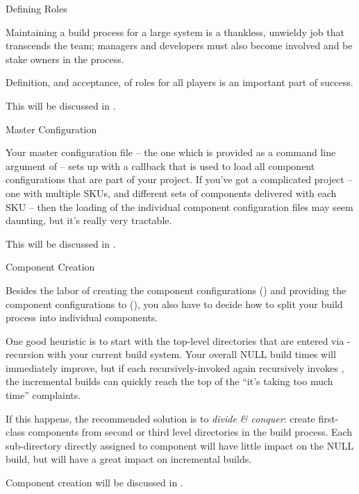 \begin{description}
\item Defining Roles

  Maintaining a build process for a large system is a thankless,
  unwieldy job that transcends the \bni team; managers and developers
  must also become involved and be stake owners in the process.

  Definition, and acceptance, of roles for all players is an important
  part of success.

  This will be discussed in .

\item Master Configuration

  Your master configuration file -- the one which is provided as a
  command line argument of \lmsbw -- sets up \lmsbw with a callback
  that is used to load all component configurations that are part of
  your project.  If you've got a complicated project -- one with
  multiple SKUs, and different sets of components delivered with each
  SKU -- then the loading of the individual component configuration
  files may seem daunting, but it's really very tractable.

  This will be discussed in .

\item Component Creation


  Besides the labor of creating the component configurations
  () and providing the component
  configurations to \lmsbw (), you
  also have to decide how to split your build process into individual
  components.

  One good heuristic is to start with the top-level directories that
  are entered via \make-recursion with your current build system.
  Your overall NULL build times will immediately improve, but if each
  recursively-invoked \makefile again recursively invokes \make, the
  incremental builds can quickly reach the top of the ``it's taking
  too much time'' complaints.

  If this happens, the recommended solution is to \emph{divide \&
    conquer}: create first-class components from second or third level
  directories in the build process.  Each sub-directory directly
  assigned to component will have little impact on the NULL build, but
  will have a great impact on incremental builds.

  Component creation will be discussed in
  .


\end{description}
